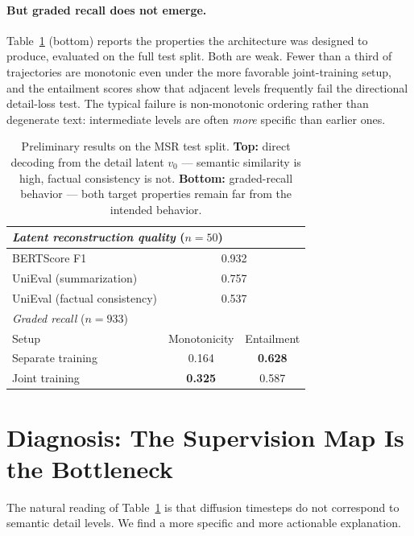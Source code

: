 \documentclass{article}
\begin{document}
\paragraph{But graded recall does not emerge.}
Table~\ref{tab:results} (bottom) reports the properties the architecture was designed to produce, evaluated on the full test split. Both are weak. Fewer than a third of trajectories are monotonic even under the more favorable joint-training setup, and the entailment scores show that adjacent levels frequently fail the directional detail-loss test. The typical failure is non-monotonic ordering rather than degenerate text: intermediate levels are often \emph{more} specific than earlier ones.

\begin{table}[h]
  \centering
  \small
  \caption{Preliminary results on the MSR test split. \textbf{Top:} direct decoding from the detail latent $v_0$ --- semantic similarity is high, factual consistency is not. \textbf{Bottom:} graded-recall behavior --- both target properties remain far from the intended behavior.}
  \label{tab:results}
  \begin{tabular}{lcc}
    \toprule
    \multicolumn{3}{l}{\emph{Latent reconstruction quality} ($n{=}50$)} \\
    \midrule
    BERTScore F1                  & \multicolumn{2}{c}{0.932} \\
    UniEval (summarization)       & \multicolumn{2}{c}{0.757} \\
    UniEval (factual consistency) & \multicolumn{2}{c}{0.537} \\
    \midrule
    \multicolumn{3}{l}{\emph{Graded recall} ($n{=}933$)} \\
    \midrule
    Setup             & Monotonicity   & Entailment \\
    Separate training & 0.164          & \textbf{0.628} \\
    Joint training    & \textbf{0.325} & 0.587 \\
    \bottomrule
  \end{tabular}
\end{table}

\section{Diagnosis: The Supervision Map Is the Bottleneck}
\label{sec:diagnosis}

The natural reading of Table~\ref{tab:results} is that diffusion timesteps do not correspond to semantic detail levels. We find a more specific and more actionable explanation.
\end{document}

